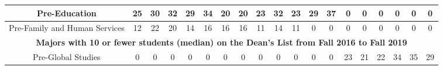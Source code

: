 \documentclass[10pt]{article}
\begin{document}
\begin{landscape}
\begin{longtable}[c]{|ccccccccccccccccccc|}
	\multicolumn{1}{|c|}{Pre-Education}                              & \multicolumn{1}{c|}{25}         & \multicolumn{1}{c|}{30}         & \multicolumn{1}{c|}{32}         & \multicolumn{1}{c|}{29}         & \multicolumn{1}{c|}{34}         & \multicolumn{1}{c|}{20}         & \multicolumn{1}{c|}{20}         & \multicolumn{1}{c|}{23}         & \multicolumn{1}{c|}{32}         & \multicolumn{1}{c|}{23}         & \multicolumn{1}{c|}{29}         & \multicolumn{1}{c|}{37}         & \multicolumn{1}{c|}{0}          & \multicolumn{1}{c|}{0}          & \multicolumn{1}{c|}{0}          & \multicolumn{1}{c|}{0}          & \multicolumn{1}{c|}{0}          & 0          \\ \hline
	\multicolumn{1}{|c|}{Pre-Family and Human Services}              & \multicolumn{1}{c|}{12}         & \multicolumn{1}{c|}{22}         & \multicolumn{1}{c|}{20}         & \multicolumn{1}{c|}{14}         & \multicolumn{1}{c|}{16}         & \multicolumn{1}{c|}{16}         & \multicolumn{1}{c|}{16}         & \multicolumn{1}{c|}{11}         & \multicolumn{1}{c|}{14}         & \multicolumn{1}{c|}{11}         & \multicolumn{1}{c|}{0}          & \multicolumn{1}{c|}{0}          & \multicolumn{1}{c|}{0}          & \multicolumn{1}{c|}{0}          & \multicolumn{1}{c|}{0}          & \multicolumn{1}{c|}{0}          & \multicolumn{1}{c|}{0}          & 0          \\ \hline
	\multicolumn{19}{|c|}{\textbf{Majors with 10 or fewer students (median) on the Dean's List from Fall 2016 to Fall 2019}}                                                                                                                                                                                                                                                                                                                                                                                                                                                                                                                                                        \\ \hline
	\multicolumn{1}{|c|}{Pre-Global Studies}                         & \multicolumn{1}{c|}{0}          & \multicolumn{1}{c|}{0}          & \multicolumn{1}{c|}{0}          & \multicolumn{1}{c|}{0}          & \multicolumn{1}{c|}{0}          & \multicolumn{1}{c|}{0}          & \multicolumn{1}{c|}{0}          & \multicolumn{1}{c|}{0}          & \multicolumn{1}{c|}{0}          & \multicolumn{1}{c|}{0}          & \multicolumn{1}{c|}{0}          & \multicolumn{1}{c|}{0}          & \multicolumn{1}{c|}{23}         & \multicolumn{1}{c|}{21}         & \multicolumn{1}{c|}{22}         & \multicolumn{1}{c|}{34}         & \multicolumn{1}{c|}{35}         & 29         \\ \hline

\end{longtable}
\end{landscape}
\end{document}
